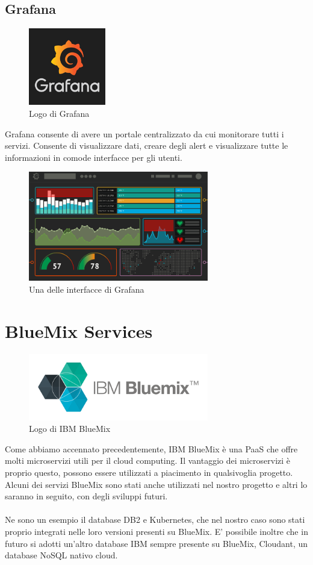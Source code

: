 \subsection{Grafana}
\begin{figure}[h!]
	\centering
	\includegraphics[width=0.3\textwidth,keepaspectratio=true]{capitoli/imgs/grafanalogo.png}
	\caption{Logo di Grafana}
\end{figure}
Grafana consente di avere un portale centralizzato da cui monitorare tutti i servizi. Consente di visualizzare dati, creare degli alert e visualizzare tutte le informazioni in comode interfacce per gli utenti.
\begin{figure}[h!]
	\centering
	\includegraphics[width=0.7\textwidth,keepaspectratio=true]{capitoli/imgs/grafanainterface.PNG}
	\caption{Una delle interfacce di Grafana}
\end{figure}

\section{BlueMix Services}
\begin{figure}[h!]
	\centering
	\includegraphics[width=0.7\textwidth,keepaspectratio=true]{capitoli/imgs/bluemixlogo.png}
	\caption{Logo di IBM BlueMix}
\end{figure}
Come abbiamo accennato precedentemente, IBM BlueMix è una PaaS che offre molti microservizi utili per il cloud computing. Il vantaggio dei microservizi è proprio questo, possono essere utilizzati a piacimento in qualsivoglia progetto. Alcuni dei servizi BlueMix sono stati anche utilizzati nel nostro progetto e altri lo saranno in seguito, con degli sviluppi futuri.
\paragraph{}
Ne sono un esempio il database DB2 e Kubernetes, che nel nostro caso sono stati proprio integrati nelle loro versioni presenti su BlueMix. E' possibile inoltre che in futuro si adotti un'altro database IBM sempre presente su BlueMix, Cloudant, un database NoSQL nativo cloud.
